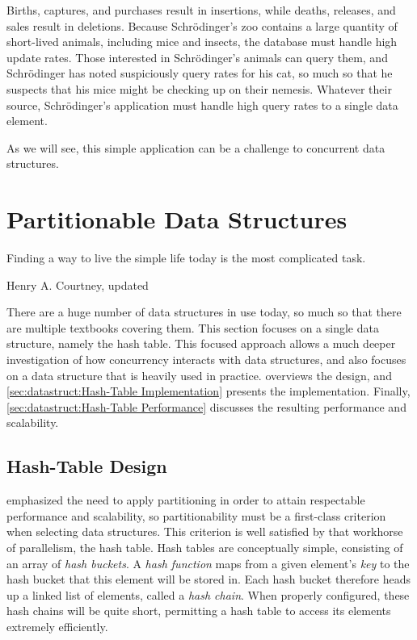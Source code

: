Births, captures, and purchases result in insertions, while deaths,
releases, and sales result in deletions.
Because Schr\"odinger's zoo contains a large quantity of short-lived
animals, including mice and insects, the database must handle
high update rates.
Those interested in Schr\"odinger's animals can query them, and
Schr\"odinger has noted suspiciously query rates for his cat, so much
so that he suspects that his mice might be checking up on their nemesis.
Whatever their source, Schr\"odinger's application must handle high
query rates to a single data element.

As we will see, this simple application can be a challenge to concurrent
data structures.

\section{Partitionable Data Structures}
\label{sec:datastruct:Partitionable Data Structures}
%
\epigraph{Finding a way to live the simple life today is the most
	  complicated task.}
	 {Henry A. Courtney, updated}

There are a huge number of data structures in use today, so much so
that there are multiple textbooks covering them.
This section focuses on a single data structure, namely the hash table.
This focused approach allows a much deeper investigation of how concurrency
interacts with data structures, and also focuses on a data structure
that is heavily used in practice.
overviews the design, and
\cref{sec:datastruct:Hash-Table Implementation}
presents the implementation.
Finally,
\cref{sec:datastruct:Hash-Table Performance}
discusses the resulting performance and scalability.

\subsection{Hash-Table Design}
\label{sec:datastruct:Hash-Table Design}

emphasized the need to apply partitioning in order to attain
respectable performance and scalability, so partitionability
must be a first-class criterion when selecting data structures.
This criterion is well satisfied by that workhorse of parallelism,
the hash table.
Hash tables are conceptually simple, consisting of an array of
\emph{hash buckets}.
A \emph{hash function} maps from a given element's \emph{key}
to the hash bucket that this element will be stored in.
Each hash bucket therefore heads up a linked list of elements,
called a \emph{hash chain}.
When properly configured, these hash chains will be quite short,
permitting a hash table to access its elements extremely efficiently.

